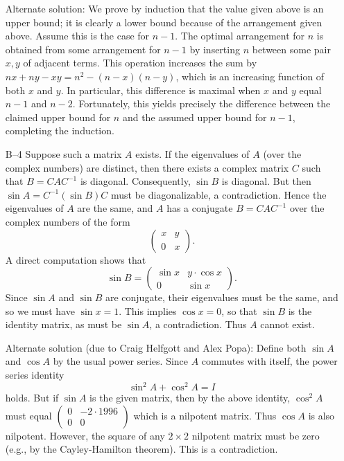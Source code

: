 \documentclass[amssymb,twocolumn,pra,10pt,aps]{revtex4-1}
\begin{document}
\begin{itemize}
Alternate solution: We prove by induction that the value given above
is an upper bound; it is clearly a lower bound because of the
arrangement given above. Assume this is the case for $n-1$. The optimal
arrangement for $n$ is obtained from some arrangement for $n-1$ by
inserting $n$ between some pair $x, y$ of adjacent terms. This
operation increases the sum by $nx + ny - xy = n^2 - (n-x)(n-y)$,
which is an increasing function of both $x$ and $y$. In particular,
this difference is maximal when $x$ and $y$ equal $n-1$ and $n-2$.
Fortunately, this yields precisely the difference between the claimed
upper bound for $n$ and the assumed upper bound for $n-1$, completing
the induction.

\item[B--4]
Suppose such a matrix $A$ exists.  If the eigenvalues of $A$ (over
the complex numbers) are distinct, then there exists a complex
matrix $C$ such that $B=CAC^{-1}$ is diagonal.  Consequently,
$\sin B$ is diagonal.  But then $\sin A=C^{-1}(\sin B)C$ must
be diagonalizable, a contradiction.  Hence the eigenvalues of $A$
are the same, and $A$ has a conjugate $B=CAC^{-1}$ over
the complex numbers of the form
\[
\left(
\begin{array}{cc}
x & y\\
0 & x
\end{array}
\right).
\]
A direct computation shows that
\[
\sin B = \left(
\begin{array}{cc}
\sin x & y\cdot \cos x\\
0 & \sin x
\end{array}
\right).
\]
Since $\sin A$ and $\sin B$ are conjugate, their eigenvalues
must be the same, and so we must have $\sin x=1$.  This implies
$\cos x=0$, so that $\sin B$ is the identity matrix, as must be $\sin
A$, a contradiction.
Thus $A$ cannot exist.

Alternate solution (due to Craig Helfgott and Alex Popa):
Define both $\sin A$ and $\cos A$ by the usual power series.
Since $A$ commutes with itself, the power series identity
\[
\sin^2 A+\cos^2 A = I
\]
holds.  But if $\sin A$ is the given matrix, then by the
above identity, $\cos^2 A$ must equal
$\left(
\begin{array}{cc}
0 & -2\cdot 1996\\
0 & 0
\end{array}
\right)$
which is a nilpotent matrix.  Thus $\cos A$ is also nilpotent.
However, the square of any $2\times 2$ nilpotent matrix must be zero
(e.g., by the Cayley-Hamilton theorem).  This is a contradiction.


\end{itemize}
\end{document}
